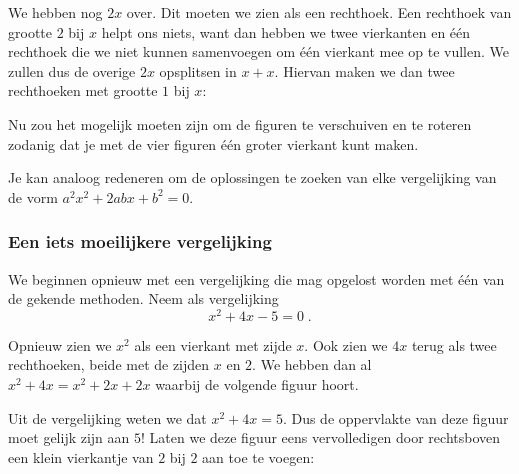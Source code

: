 \begin{center}

\end{center}

We hebben nog $2x$ over. Dit moeten we zien als een rechthoek. Een rechthoek van grootte $2$ bij $x$ helpt ons niets, want dan hebben we twee vierkanten en \'e\'en rechthoek die we niet kunnen samenvoegen om \'e\'en vierkant mee op te vullen. We zullen dus de overige $2x$ opsplitsen in $x + x$. Hiervan maken we dan twee rechthoeken met grootte $1$ bij $x$:

\begin{center}

\end{center}

Nu zou het mogelijk moeten zijn om de figuren te verschuiven en te roteren zodanig dat je met de vier figuren \'e\'en groter vierkant kunt maken.


\answer[5cm]{
\begin{center}

\end{center}
}



Je kan analoog redeneren om de oplossingen te zoeken van elke vergelijking van de vorm $a^2x^2+2abx+b^2=0$. 

\subsubsection{Een iets moeilijkere vergelijking}

We beginnen opnieuw met een vergelijking die mag opgelost worden met \'e\'en van de gekende methoden. Neem als vergelijking
$$
x^2+4x-5=0\;.
$$

Opnieuw zien we $x^2$ als een vierkant met zijde $x$. Ook zien we $4x$ terug als twee rechthoeken, beide met de zijden $x$ en $2$. We hebben dan al $x^2+4x=x^2+2x+2x$ waarbij de volgende figuur hoort.
\begin{center}

\end{center}

Uit de vergelijking weten we dat $x^2+4x=5$. Dus de oppervlakte van deze figuur moet gelijk zijn aan $5$! Laten we deze figuur eens vervolledigen door rechtsboven een klein vierkantje van $2$ bij $2$ aan toe te voegen:

